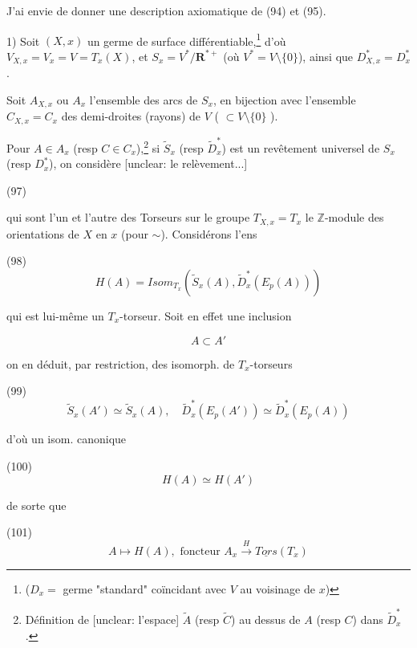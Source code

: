 J'ai envie de donner une description axiomatique de (94) et (95).

1) Soit $(X,x)$ un germe de surface différentiable,\footnote{($D_x = $ germe "standard" coïncidant avec $V$ au voisinage de $x$)} d'où $V_{X,x} = V_x = V = T_x(X)$, et $S_x = V^*/\mathbf{R}^{*+}$ (où $V^* = V \setminus \{0\}$), ainsi que $D_{X,x}^* = D_x^*$.

Soit $A_{X,x}$ ou $A_x$ l'ensemble des arcs de $S_x$, en bijection avec l'ensemble $C_{X,x} = C_x$ des demi-droites (rayons) de $V$ ( $\subset V \setminus \{0\}$ ).

Pour $A \in A_x$ (resp $C \in C_x$),\footnote{Définition de [unclear: l'espace] $\tilde{A}$ (resp $\tilde{C}$) au dessus de $A$ (resp $C$) dans $\tilde{D}_x^*$.} si $\tilde{S}_x$ (resp $\tilde{D}_x^*$) est un revêtement universel de $S_x$ (resp $D_x^*$), on considère [unclear: le relèvement...]

\newpage


(97) 

qui sont l'un et l'autre des Torseurs sur le groupe $T_{X,x} = T_x$ le $\mathbb{Z}$-module des orientations de $X$ en $x$ (pour $\sim$). Considérons l'ens

(98) $$H(A) = Isom_{T_x}(\tilde{S}_x(A), \tilde{D}_x^*(E_p(A)))$$

qui est lui-même un $T_x$-torseur. Soit en effet une inclusion

$$A \subset A'$$

on en déduit, par restriction, des isomorph. de $T_x$-torseurs

(99) $$\tilde{S}_x(A') \simeq \tilde{S}_x(A), \quad \tilde{D}_x^*(E_p(A')) \simeq \tilde{D}_x^*(E_p(A))$$

d'où un isom. canonique

(100) $$H(A) \simeq H(A')$$

de sorte que 

(101) $$A \mapsto H(A), \text{ foncteur } A_x \xrightarrow{H} \underline{Tors}(T_x)$$

